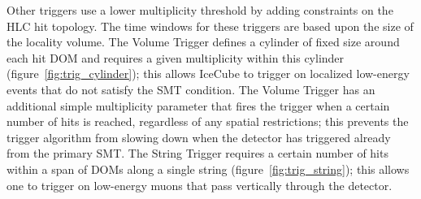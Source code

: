Other triggers use a lower multiplicity threshold by adding constraints on
the HLC hit topology.  The time windows for these triggers are based upon
the size of the locality volume. The Volume Trigger defines a cylinder of fixed size around
each hit DOM and requires a given multiplicity within this cylinder
(figure~\ref{fig:trig_cylinder}); this allows IceCube to trigger on localized
low-energy events that do not satisfy the SMT condition.  The Volume Trigger
has an additional simple multiplicity parameter that fires the trigger when
a certain number of hits is reached, regardless of any spatial
restrictions; this prevents the trigger 
algorithm from slowing down when the detector has triggered already from
the primary SMT. The String Trigger requires a certain number of hits
within a span of DOMs along a single string 
(figure~\ref{fig:trig_string}); this allows one to trigger on low-energy
muons that pass vertically through the detector.

